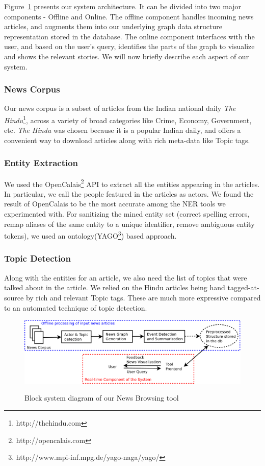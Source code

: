 Figure~\ref{fig:block-system-design} presents our system architecture. It can be divided into
two major components - Offline and Online. The offline component handles incoming news articles, and augments them into our underlying graph data structure representation stored
in the database. The online component interfaces with the user, and based on the user's query, identifies the parts of the graph to visualize and 
shows the relevant stories. We will now briefly describe each aspect of our system.

\subsubsection*{News Corpus}
Our news corpus is a subset of articles from the Indian national daily {\em The Hindu}\footnote{http://thehindu.com}, across a variety of broad categories like Crime, Economy, Government, etc. 
{\em The Hindu} was chosen because it is a popular Indian daily, and offers a convenient way to download articles along with rich meta-data like Topic tags.

\subsubsection*{Entity Extraction}
We used the OpenCalais\footnote{http://opencalais.com} API to extract all the entities appearing in the articles. In particular, we call
the people featured in the articles as actors. We found the result of OpenCalais to be the most accurate among the NER tools we experimented with.
For sanitizing the mined entity set (correct spelling errors, remap aliases of the same entity to a unique identifier, remove ambiguous entity tokens),
we used an ontology(YAGO\footnote{http://www.mpi-inf.mpg.de/yago-naga/yago/}) based approach.

\subsubsection*{Topic Detection}
Along with the entities for an article, we also need the list of topics that were talked about in the article. 
We relied on the Hindu articles being hand tagged-at-source by rich and relevant Topic tags. These are much more expressive compared to an automated technique of topic detection.
\begin{figure}
\caption{Block system diagram of our News Browsing tool}
\includegraphics[scale=0.24]{figures/system-design.pdf}
\label{fig:block-system-design}
\end{figure}

